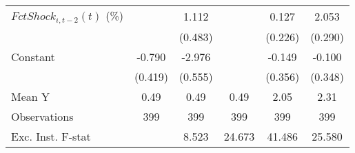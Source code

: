 {\begin{tabular}{l*{5}{c}}
\addlinespace
$ FctShock_{i,t-2}(t)$ (\%)&                     &       1.112\sym{**} &                     &       0.127         &       2.053\sym{***}\\
                    &                     &     (0.483)         &                     &     (0.226)         &     (0.290)         \\
\addlinespace
Constant            &      -0.790\sym{*}  &      -2.976\sym{***}&                     &      -0.149         &      -0.100         \\
                    &     (0.419)         &     (0.555)         &                     &     (0.356)         &     (0.348)         \\
\midrule
Mean Y              &        0.49         &        0.49         &        0.49         &        2.05         &        2.31         \\
Observations        &         399         &         399         &         399         &         399         &         399         \\
Exc. Inst. F-stat   &                     &       8.523         &      24.673         &      41.486         &      25.580         \\
\bottomrule
\end{tabular}
}
